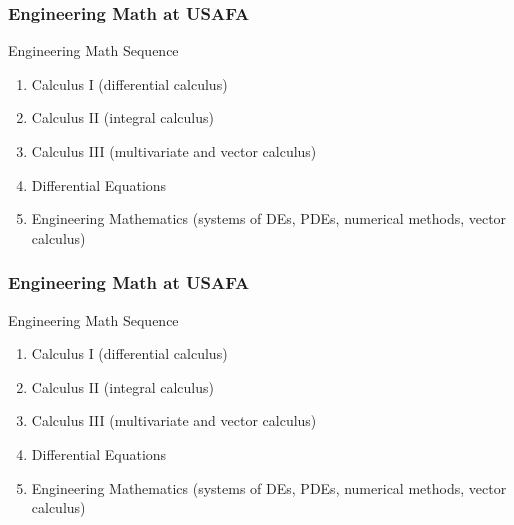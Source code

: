 \documentclass{beamer}
\begin{document}
\begin{frame}
\begin{center}
\frametitle{Engineering Math at USAFA}

Engineering Math Sequence

\begin{enumerate}

\item Calculus I (differential calculus)

\item Calculus II (integral calculus)

\item Calculus III (multivariate and vector calculus)

\item Differential Equations

\item Engineering Mathematics (systems of DEs, PDEs, numerical methods, vector calculus)

\end{enumerate}

\end{center}
\end{frame}


\begin{frame}
\begin{center}
\frametitle{Engineering Math at USAFA}

Engineering Math Sequence

\begin{enumerate}

\item Calculus I (differential calculus)

\item Calculus II (integral calculus)

\item {\color{red}Calculus III} (multivariate and vector calculus)

\item Differential Equations

\item {\color{red}Engineering Mathematics} (systems of DEs, PDEs, numerical methods, vector calculus)

\end{enumerate}

\end{center}
\end{frame}
 
\end{document}

